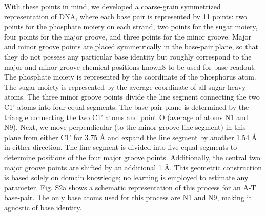 With these points in mind, we developed a coarse-grain symmetrized representation of DNA, where each base pair is represented by 11 points: two points for the phosphate moiety on each strand, two points for the sugar moiety, four points for the major groove, and three points for the minor groove. Major and minor groove points are placed symmetrically in the base-pair plane, so that they do not possess any particular base identity but roughly correspond to the major and minor groove chemical positions known8 to be used for base readout. The phosphate moiety is represented by the coordinate of the phosphorus atom. The sugar moiety is represented by the average coordinate of all sugar heavy atoms. The three minor groove points divide the line segment connecting the two C1' atoms into four equal segments. The base-pair plane is determined by the triangle connecting the two C1' atoms and point O (average of atoms N1 and N9). Next, we move perpendicular (to the minor groove line segment) in this plane from either C1' for 3.75 Å and expand the line segment by another 1.54 Å in either direction. The line segment is divided into five equal segments to determine positions of the four major groove points. Additionally, the central two major groove points are shifted by an additional 1 Å. This geometric construction is based solely on domain knowledge; no learning is employed to estimate any parameter. Fig. S2a shows a schematic representation of this process for an A-T base-pair. The only base atoms used for this process are N1 and N9, making it agnostic of base identity. 

